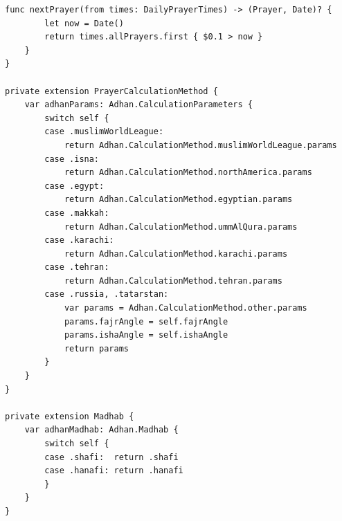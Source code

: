 \begin{lstlisting}[basicstyle=\tiny\ttfamily,breaklines=true]
    func nextPrayer(from times: DailyPrayerTimes) -> (Prayer, Date)? {
        let now = Date()
        return times.allPrayers.first { $0.1 > now }
    }
}

private extension PrayerCalculationMethod {
    var adhanParams: Adhan.CalculationParameters {
        switch self {
        case .muslimWorldLeague:
            return Adhan.CalculationMethod.muslimWorldLeague.params
        case .isna:
            return Adhan.CalculationMethod.northAmerica.params
        case .egypt:
            return Adhan.CalculationMethod.egyptian.params
        case .makkah:
            return Adhan.CalculationMethod.ummAlQura.params
        case .karachi:
            return Adhan.CalculationMethod.karachi.params
        case .tehran:
            return Adhan.CalculationMethod.tehran.params
        case .russia, .tatarstan:
            var params = Adhan.CalculationMethod.other.params
            params.fajrAngle = self.fajrAngle
            params.ishaAngle = self.ishaAngle
            return params
        }
    }
}

private extension Madhab {
    var adhanMadhab: Adhan.Madhab {
        switch self {
        case .shafi:  return .shafi
        case .hanafi: return .hanafi
        }
    }
}
\end{lstlisting}

